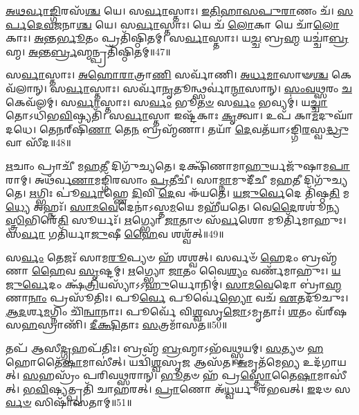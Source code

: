    \ul{𑌅}\-\-\ul{𑌥}\-\-\ul{𑌰𑍍𑌵𑌾}\-\-\ul{𑌙𑍍𑌗𑌿}\-𑌰𑌸᳴\-\ul{𑌶𑍍𑌚} 𑌯𑍇।
   𑌸\-\ul{𑌰𑍍𑌵𑌾}\-𑌸𑍍𑌤𑌾𑌃।
   \ul{𑌇}\-\-\ul{𑌤𑌿}\-\-\ul{𑌹𑌾}\-\-\ul{𑌸}\-\-\ul{𑌪𑍁}\-\-\ul{𑌰𑌾}\-𑌣𑌂 𑌚᳴।
   \ul{𑌸}\-\-\ul{𑌰𑍍𑌪}\-\-\ul{𑌦𑍇}\-\-\ul{𑌵}\-\-\ul{𑌜}\-𑌨𑌾\-\ul{𑌶𑍍𑌚} 𑌯𑍇।
   𑌸\-\ul{𑌰𑍍𑌵𑌾}\-𑌸𑍍𑌤𑌾𑌃।
   𑌯𑍇 𑌚᳴ \ul{𑌲𑍋}\-𑌕𑌾 𑌯𑍇 𑌚𑌾᳴\-\ul{𑌲𑍋}\-𑌕𑌾𑌃।
   \ul{𑌅}\-𑌨𑍍𑌤\-\ul{𑌰𑍍𑌭𑍂}\-𑌤𑌂 𑌪𑍍𑌰𑌤𑌿᳴𑌷𑍍𑌠𑌿𑌤𑌮𑍍।
   𑌸\-\ul{𑌰𑍍𑌵𑌾}\-𑌸𑍍𑌤𑌾𑌃।
   𑌯\-\ul{𑌚𑍍𑌚} 𑌬𑍍𑌰\-\ul{𑌹𑍍𑌮}\- 𑌯𑌚𑍍𑌚𑌾॑\-\ul{𑌬𑍍𑌰}\-𑌹𑍍𑌮।
   \ul{𑌅}\-𑌨𑍍𑌤\-\ul{𑌰𑍍𑌬𑍍𑌰}\-𑌹𑍍𑌮𑌨𑍍𑌪𑍍𑌰𑌤𑌿᳴𑌷𑍍𑌠𑌿𑌤𑌮𑍍॥47॥

   𑌸\-\ul{𑌰𑍍𑌵𑌾}\-𑌸𑍍𑌤𑌾𑌃।
   \ul{𑌅}\-\-\ul{𑌹𑍋}\-\-\ul{𑌰𑌾}\-𑌤𑍍𑌰𑌾\-\ul{𑌣𑌿} 𑌸𑌰𑍍𑌵𑌾᳴𑌣𑌿।
   \ul{𑌅}\-\-\ul{𑌰𑍍𑌧}\-\-\ul{𑌮𑌾}\-𑌸𑌾𑍟\-\ul{𑌶𑍍𑌚} 𑌕𑍇𑌵᳴𑌲𑌾𑌨𑍍।
   𑌸\-\ul{𑌰𑍍𑌵𑌾}\-𑌸𑍍𑌤𑌾𑌃।
   𑌸𑌰𑍍𑌵𑌾᳴\-\ul{𑌨𑍃}\-𑌤𑍂𑌨𑍍𑌥𑍍𑌸𑌰𑍍𑌵𑌾॑\-\ul{𑌨𑍍𑌮𑌾}\-𑌸𑌾𑌨𑍍।
   \ul{𑌸𑌂}\-\-\ul{𑌵}\-\-\ul{𑌥𑍍𑌸}\-𑌰𑌂 \ul{𑌚} 𑌕𑍇𑌵᳴𑌲𑌮𑍍।
   𑌸\-\ul{𑌰𑍍𑌵𑌾}\-𑌸𑍍𑌤𑌾𑌃।
   𑌸\-\ul{𑌰𑍍𑌵𑌂} 𑌭𑍂\-\ul{𑌤}\-\-\ul{𑍞} 𑌸\-\ul{𑌰𑍍𑌵𑌂} 𑌭𑌵𑍍𑌯𑌮𑍍॑।
   𑌯\-\ul{𑌚𑍍𑌚𑌾}\-𑌤𑍋𑌽𑌧𑌿᳴𑌭\-\ul{𑌵𑌿}\-𑌷𑍍𑌯𑌤𑌿᳴।
   𑌸\-\ul{𑌰𑍍𑌵𑌾}\-𑌸𑍍𑌤𑌾 𑌇𑌷𑍍𑌟᳴𑌕𑌾𑌃 \ul{𑌕𑍃}\-𑌤𑍍𑌵𑌾।
   𑌉𑌪᳴ 𑌕𑌾\-\ul{𑌮}\-𑌦𑍁𑌘𑌾᳴ 𑌦𑌧𑍇।
   𑌤𑍇𑌨𑌰𑍍‌𑌷𑌿᳴\-\ul{𑌣𑌾} 𑌤𑍇\-\ul{𑌨} 𑌬𑍍𑌰𑌹𑍍𑌮᳴𑌣𑌾।
   𑌤𑌯𑌾᳴ \ul{𑌦𑍇}\-𑌵𑌤᳴𑌯𑌾𑌽𑌙𑍍𑌗𑌿\-\ul{𑌰}\-𑌸𑍍𑌵\-\ul{𑌦𑍍𑌧𑍍𑌰𑍁}\-𑌵𑌾 𑌸𑍀᳴𑌦॥48॥
\anuvakamend
  
   \ul{𑌋}\-𑌚𑌾𑌂 𑌪𑍍𑌰𑌾𑌚𑍀᳴ 𑌮\-\ul{𑌹}\-𑌤𑍀 𑌦𑌿𑌗𑍁᳴𑌚𑍍𑌯𑌤𑍇।
   𑌦𑌕𑍍𑌷𑌿᳴𑌣𑌾𑌮𑌾\-\ul{𑌹𑍁}\-𑌰𑍍𑌯𑌜𑍁᳴𑌷𑌾𑌮\-\ul{𑌪𑌾}\-𑌰𑌾𑌮𑍍।
   𑌅𑌥᳴𑌰𑍍𑌵\-\ul{𑌣𑌾}\-𑌮𑌙𑍍𑌗𑌿᳴𑌰𑌸𑌾𑌂 \ul{𑌪𑍍𑌰}\-𑌤𑍀𑌚𑍀॑।
   𑌸𑌾\-\ul{𑌮𑍍𑌨𑌾}\-𑌮𑍁𑌦𑍀᳴𑌚𑍀 𑌮\-\ul{𑌹}\-𑌤𑍀 𑌦𑌿𑌗𑍁᳴𑌚𑍍𑌯𑌤𑍇।
   \ul{𑌋}\-𑌗𑍍𑌭𑌿𑌃 𑌪𑍂॑\-\ul{𑌰𑍍𑌵𑌾}\-𑌹𑍍𑌣𑍇 \ul{𑌦𑌿}\-𑌵𑌿 \ul{𑌦𑍇}\-𑌵 𑌈᳴𑌯𑌤𑍇।
   \ul{𑌯}\-\-\ul{𑌜𑍁}\-\-\ul{𑌰𑍍𑌵𑍇}\-𑌦𑍇 𑌤𑌿᳴𑌷𑍍𑌠\-\ul{𑌤𑌿} 𑌮\-\ul{𑌧𑍍𑌯𑍇} 𑌅𑌹𑍍𑌨𑌃᳴।
   \ul{𑌸𑌾}\-\-\ul{𑌮}\-\-\ul{𑌵𑍇}\-𑌦𑍇𑌨𑌾॑𑌽𑌸𑍍𑌤\-\ul{𑌮}\-𑌯𑍇 𑌮𑌹𑍀᳴𑌯𑌤𑍇।
   𑌵𑍇\-\ul{𑌦𑍈}\-𑌰𑌶𑍂॑𑌨𑍍𑌯\-\ul{𑌸𑍍𑌤𑍍𑌰𑌿}\-𑌭𑌿𑌰𑍇᳴\-\ul{𑌤𑌿} 𑌸𑍂𑌰𑍍𑌯𑌃᳴।
   \ul{𑌋}\-𑌗𑍍𑌭𑍍𑌯𑍋 \ul{𑌜𑌾}\-𑌤𑌾𑍞 𑌸᳴\-\ul{𑌰𑍍𑌵}\-𑌶𑍋 𑌮𑍂𑌰𑍍𑌤𑌿᳴𑌮𑌾𑌹𑍁𑌃।
   𑌸\-\ul{𑌰𑍍𑌵𑌾} 𑌗𑌤𑌿᳴𑌰𑍍𑌯𑌾\-\ul{𑌜𑍁}\-𑌷𑍀 \ul{𑌹𑍈}\-𑌵 𑌶𑌶𑍍𑌵᳴𑌤𑍍॥49॥

   𑌸\-\ul{𑌰𑍍𑌵𑌂} 𑌤𑍇𑌜𑌃᳴ 𑌸𑌾𑌮\-\ul{𑌰𑍂}\-𑌪𑍍𑌯𑍞 𑌹᳴ 𑌶𑌶𑍍𑌵𑌤𑍍।
   𑌸𑌰𑍍𑌵𑍞᳴ \ul{𑌹𑍇}\-𑌦𑌂 𑌬𑍍𑌰𑌹𑍍𑌮᳴𑌣𑌾 \ul{𑌹𑍈}\-𑌵 \ul{𑌸𑍃}\-𑌷𑍍𑌟𑌮𑍍।
   \ul{𑌋}\-𑌗𑍍𑌭𑍍𑌯𑍋 \ul{𑌜𑌾}\-𑌤𑌂 𑌵𑍈\-\ul{𑌶𑍍𑌯𑌂} 𑌵𑌰𑍍𑌣᳴𑌮𑌾𑌹𑍁𑌃।
   \ul{𑌯}\-\-\ul{𑌜𑍁}\-\-\ul{𑌰𑍍𑌵𑍇}\-𑌦𑌂 𑌕𑍍𑌷᳴\-\ul{𑌤𑍍𑌰𑌿}\-𑌯𑌸𑍍𑌯𑌾᳴𑌽𑌽\-\ul{𑌹𑍁}\-𑌰𑍍𑌯𑍋𑌨𑌿𑌮𑍍॑।
   \ul{𑌸𑌾}\-\-\ul{𑌮}\-\-\ul{𑌵𑍇}\-𑌦𑍋 𑌬𑍍𑌰𑌾॑\-\ul{𑌹𑍍𑌮}\-𑌣𑌾\-\ul{𑌨𑌾𑌂} 𑌪𑍍𑌰𑌸𑍂᳴𑌤𑌿𑌃।
   𑌪𑍂\-\ul{𑌰𑍍𑌵𑍇} 𑌪𑍂𑌰𑍍𑌵𑍇॑\-\ul{𑌭𑍍𑌯𑍋} 𑌵𑌚᳴ \ul{𑌏}\-𑌤𑌦𑍂᳴𑌚𑍁𑌃।
   \ul{𑌆}\-\-\ul{𑌦}\-𑌰𑍍\mbox{}𑌶\-\ul{𑌮}\-𑌗𑍍𑌨𑌿𑌂 𑌚𑌿᳴\-\ul{𑌨𑍍𑌵𑌾}\-𑌨𑌾𑌃।
   𑌪𑍂𑌰𑍍𑌵𑍇᳴ 𑌵𑌿\-\ul{𑌶𑍍𑌵}\-𑌸𑍃\-\ul{𑌜𑍋}\-𑌽𑌮𑍃𑌤𑌾𑌃॑।
   \ul{𑌶}\-𑌤𑌂 𑌵᳴𑌰𑍍‌𑌷𑌸\-\ul{𑌹}\-𑌸𑍍𑌰𑌾𑌣𑌿᳴।
   \ul{𑌦𑍀}\-\-\ul{𑌕𑍍𑌷𑌿}\-𑌤𑌾𑌃 \ul{𑌸}\-𑌤𑍍𑌰𑌮𑌾᳴𑌸𑌤॥50॥

   𑌤𑌪᳴ 𑌆𑌸𑍀\-\ul{𑌦𑍍𑌗𑍃}\-𑌹𑌪᳴𑌤𑌿𑌃।
   𑌬𑍍𑌰𑌹𑍍𑌮᳴ \ul{𑌬𑍍𑌰}\-𑌹𑍍𑌮𑌾𑌽𑌭᳴𑌵\-\ul{𑌥𑍍𑌸𑍍𑌵}\-𑌯𑌮𑍍।
   \ul{𑌸}\-𑌤𑍍𑌯𑍞 \ul{𑌹} 𑌹𑍋𑌤𑍈᳴\-\ul{𑌷𑌾}\-𑌮𑌾𑌸𑍀॑𑌤𑍍।
   𑌯𑌦𑍍𑌵𑌿᳴\-\ul{𑌶𑍍𑌵}\-𑌸𑍃\-\ul{𑌜} 𑌆𑌸᳴𑌤।
   \ul{𑌅}\-𑌮𑍃𑌤᳴𑌮𑍇\-\ul{𑌭𑍍𑌯} 𑌉𑌦᳴𑌗𑌾𑌯𑌤𑍍।
   \ul{𑌸}\-𑌹𑌸𑍍𑌰𑌂᳴ 𑌪𑌰𑌿𑌵\-\ul{𑌥𑍍𑌸}\-𑌰𑌾𑌨𑍍।
   \ul{𑌭𑍂}\-𑌤𑍞 𑌹᳴ 𑌪𑍍𑌰\-\ul{𑌸𑍍𑌤𑍋}\-𑌤𑍈\-\ul{𑌷𑌾}\-𑌮𑌾𑌸𑍀॑𑌤𑍍।
   \ul{𑌭}\-\-\ul{𑌵𑌿}\-𑌷𑍍𑌯𑌤𑍍𑌪𑍍𑌰𑌤𑌿᳴ 𑌚𑌾𑌹𑌰𑌤𑍍।
   \ul{𑌪𑍍𑌰𑌾}\-𑌣𑍋 𑌅᳴\-\ul{𑌧𑍍𑌵}\-𑌰𑍍𑌯𑍁𑌰᳴𑌭𑌵𑌤𑍍।
   \ul{𑌇}\-𑌦𑍞 𑌸\-\ul{𑌰𑍍𑌵}\-\-\ul{𑍞} 𑌸𑌿𑌷𑌾᳴𑌸𑌤𑌾𑌮𑍍॥51॥

